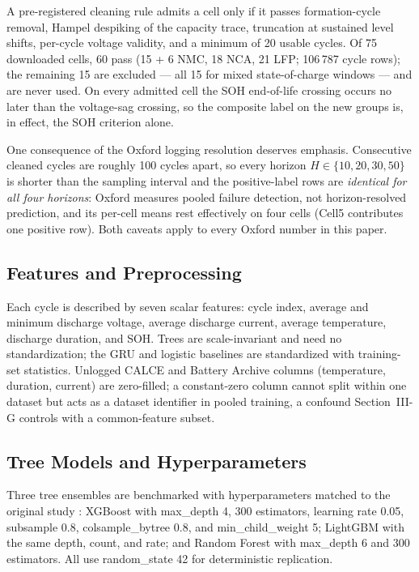 \documentclass[preprint,12pt]{elsarticle}
\begin{document}
A pre-registered cleaning rule admits a cell only if it passes formation-cycle removal, Hampel despiking of the capacity trace, truncation at sustained level shifts, per-cycle voltage validity, and a minimum of 20 usable cycles. Of 75 downloaded cells, 60 pass (15 + 6 NMC, 18 NCA, 21 LFP; 106\,787 cycle rows); the remaining 15 are excluded --- all 15 for mixed state-of-charge windows --- and are never used. On every admitted cell the SOH end-of-life crossing occurs no later than the voltage-sag crossing, so the composite label on the new groups is, in effect, the SOH criterion alone.

One consequence of the Oxford logging resolution deserves emphasis. Consecutive cleaned cycles are roughly 100 cycles apart, so every horizon $H\in\{10,20,30,50\}$ is shorter than the sampling interval and the positive-label rows are \emph{identical for all four horizons}: Oxford measures pooled failure detection, not horizon-resolved prediction, and its per-cell means rest effectively on four cells (Cell5 contributes one positive row). Both caveats apply to every Oxford number in this paper.

\subsection{Features and Preprocessing}
Each cycle is described by seven scalar features: cycle index, average and minimum discharge voltage, average discharge current, average temperature, discharge duration, and SOH. Trees are scale-invariant and need no standardization; the GRU and logistic baselines are standardized with training-set statistics. Unlogged CALCE and Battery Archive columns (temperature, duration, current) are zero-filled; a constant-zero column cannot split within one dataset but acts as a dataset identifier in pooled training, a confound Section~III-G controls with a common-feature subset.

\subsection{Tree Models and Hyperparameters}
Three tree ensembles are benchmarked with hyperparameters matched to the original study \cite{shikdar2026learning}: XGBoost \cite{chen2016xgboost} with max\_depth 4, 300 estimators, learning rate 0.05, subsample 0.8, colsample\_bytree 0.8, and min\_child\_weight 5; LightGBM \cite{ke2017lightgbm} with the same depth, count, and rate; and Random Forest \cite{breiman2001random} with max\_depth 6 and 300 estimators. All use random\_state 42 for deterministic replication.
\end{document}
